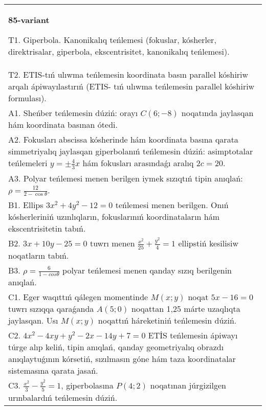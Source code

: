 \documentclass{article}
\begin{document}
\begin{tabular}{m{17cm}}
\textbf{85-variant}
\newline

T1. Giperbola. Kanonikalıq teńlemesi (fokuslar, kósherler, direktrisalar, giperbola, ekscentrisitet, kanonikalıq teńlemesi).\\

T2. ETIS-tıń ulıwma teńlemesin koordinata basın parallel kóshiriw arqalı ápiwayılastırıń (ETIS- tıń ulıwma teńlemesin parallel kóshiriw formulası).\\

A1. Sheńber teńlemesin dúziń: orayı $C (6 ;-8) $ noqatında jaylasqan hám koordinata basınan ótedi.\\

A2. Fokusları abscissa kósherinde hám koordinata basına qarata simmetriyalıq jaylasqan giperbolanıń teńlemesin dúziń: asimptotalar teńlemeleri $y=\pm \frac{4}{3}x$ hám fokusları arasındaǵı aralıq $2 c=20$.\\

A3. Polyar teńlemesi menen berilgen iymek sızıqtıń tipin anıqlań: $\rho=\frac{12}{2-\cos\theta}$.\\

B1. Ellips $3x^{2} + 4y^{2} - 12 = 0$ teńlemesi menen berilgen. Onıń kósherleriniń uzınlıqların, fokuslarınıń koordinataların hám ekscentrisitetin tabıń.  \\

B2. $3x + 10y - 25 = 0$ tuwrı menen $\frac{x^{2}}{25} + \frac{y^{2}}{4} = 1$ ellipstiń kesilisiw noqatların tabıń.\\

B3. $\rho = \frac{6}{1 - cos\theta}$ polyar teńlemesi menen qanday sızıq berilgenin anıqlań.  \\

C1. Eger waqıttıń qálegen momentinde $M(x;y)$ noqat $5x - 16 = 0$ tuwrı sızıqqa qaraǵanda $A(5;0)$ noqattan 1,25 márte uzaqlıqta jaylasqan. Usı $M(x;y)$ noqattıń háreketiniń teńlemesin dúziń.  \\

C2. $4x^{2} - 4xy + y^{2} - 2x - 14y + 7 = 0$ ETİS teńlemesin ápiwayı túrge alıp keliń, tipin anıqlań, qanday geometriyalıq obrazdı anıqlaytuǵının kórsetiń, sızılmasın góne hám taza koordinatalar sistemasına qarata jasań.  \\

C3. $\frac{x^{2}}{3} - \frac{y^{2}}{5} = 1$, giperbolasına $P(4;2)$ noqatınan júrgizilgen urınbalardıń teńlemesin dúziń.  \\

\end{tabular}
\vspace{1cm}
\end{document}
